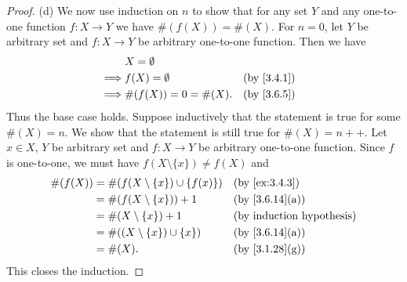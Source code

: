\begin{proof}{(d)}
  We now use induction on \(n\) to show that for any set \(Y\) and any one-to-one function \(f : X \to Y\) we have \(\#(f(X)) = \#(X)\).
  For \(n = 0\), let \(Y\) be arbitrary set and \(f : X \to Y\) be arbitrary one-to-one function.
  Then we have
  \begin{align*}
             & X = \emptyset                                       \\
    \implies & f(X) = \emptyset      &  & \text{(by \cref{3.4.1})} \\
    \implies & \#(f(X)) = 0 = \#(X). &  & \text{(by \cref{3.6.5})}
  \end{align*}
  Thus the base case holds.
  Suppose inductively that the statement is true for some \(\#(X) = n\).
  We show that the statement is still true for \(\#(X) = n++\).
  Let \(x \in X\), \(Y\) be arbitrary set and \(f : X \to Y\) be arbitrary one-to-one function.
  Since \(f\) is one-to-one, we must have \(f(X \setminus \{x\}) \neq f(X)\) and
  \begin{align*}
    \#(f(X)) & = \#(f(X \setminus \{x\}) \cup \{f(x)\}) &  & \text{(by \cref{ex:3.4.3})}      \\
             & = \#(f(X \setminus \{x\})) + 1           &  & \text{(by \cref{3.6.14}(a))}     \\
             & = \#(X \setminus \{x\}) + 1              &  & \text{(by induction hypothesis)} \\
             & = \#((X \setminus \{x\}) \cup \{x\})     &  & \text{(by \cref{3.6.14}(a))}     \\
             & = \#(X).                                 &  & \text{(by \cref{3.1.28}(g))}
  \end{align*}
  This closes the induction.
\end{proof}

